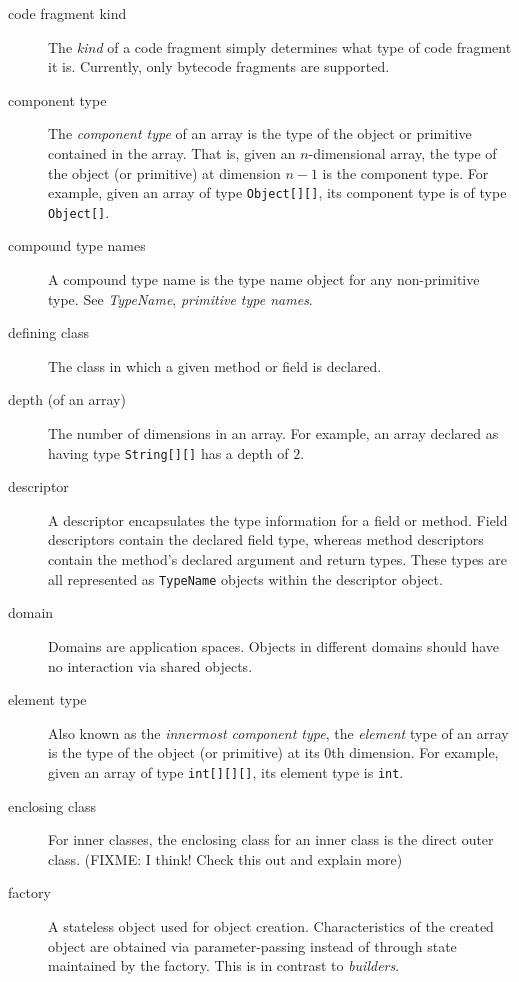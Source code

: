 \documentclass{report}
\begin{document}
\begin{description}
	\item[code fragment kind] The {\em kind} of a code fragment simply
	determines what type of code fragment it is. Currently, only
	bytecode fragments are supported.

	\item[component type] The {\em component type} of an array
	is the type of the object or primitive contained in the array.
	That is, given an $n$-dimensional array, the type of the object
	(or primitive) at dimension $n-1$ is the component type. For
	example, given an array of type \texttt{Object[][]}, its
	component type is of type \texttt{Object[]}.

	\item[compound type names] A compound type name is the type name
	object for any non-primitive type. See {\em TypeName},
	{\em primitive type names}.

	\item[defining class] The class in which a given method or field is 
	declared.

	\item[depth (of an array)] The number of dimensions in an array. For
	example, an array declared as having type \texttt{String[][]} has
	a depth of $2$.

	\item[descriptor] A descriptor encapsulates the type information for
	a field or method. Field descriptors contain the declared field type,
	whereas method descriptors contain the method's declared argument
	and return types. These types are all represented as \texttt{TypeName}
	objects within the descriptor object.

	\item[domain] Domains are application spaces. Objects in different
	domains should have no interaction via shared objects.

	\item[element type] Also known as the {\em innermost component
	type}, the {\em element} type of an array is the type of the
	object (or primitive) at its $0$th dimension. For example, given
	an array of type \texttt{int[][][]}, its element type is \texttt{int}.

	\item[enclosing class] For inner classes, the enclosing class for
	an inner class is the direct outer class. (FIXME: I think! Check this 
	out and explain more)

	\item[factory] A stateless object used for object creation. 
	Characteristics of the created object are obtained via 
	parameter-passing instead of through state maintained by the
	factory. This is in contrast to {\em builders}.


\end{description}
\end{document}
